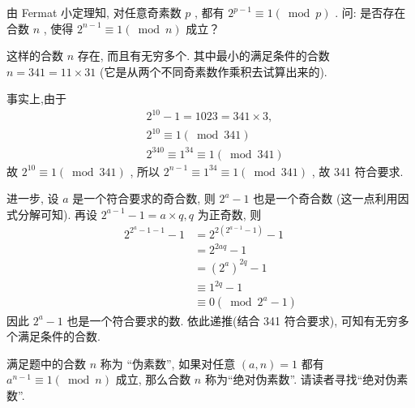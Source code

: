 \begin{example}
	由 Fermat 小定理知, 对任意奇素数 $p$ , 都有 $2^{p-1} \equiv 1(\bmod p)$ . 问: 是否存在合数 $n$ , 使得 $2^{n-1} \equiv 1(\bmod n)$ 成立？
\end{example}
\begin{solution}
	这样的合数 $n$ 存在, 而且有无穷多个. 其中最小的满足条件的合数 $n=341=11 \times 31$ (它是从两个不同奇素数作乘积去试算出来的).

	事实上,由于
	\begin{align*}
		 & 2^{10}-1=1023=341 \times 3,               \\
		 & 2^{10} \equiv 1(\bmod 341)                \\
		 & 2^{340} \equiv 1^{34} \equiv 1(\bmod 341)
	\end{align*}
	故 $2^{10} \equiv 1(\bmod 341)$ ,
	所以  $2^{n-1} \equiv 1^34 \equiv 1(\bmod 341)$ ,
	故 341 符合要求.

	进一步, 设 $a$ 是一个符合要求的奇合数, 则 $2^{a}-1$ 也是一个奇合数 (这一点利用因式分解可知). 再设 $2^{a-1}-1=a \times q, q$ 为正奇数, 则
	\begin{align*}
		2^{2^{a}-1-1}-1 & =2^{2\left(2^{a-1}-1\right)}-1     \\
		                & =2^{2 a q}-1                       \\
		                & =\left(2^{a}\right)^{2 q}-1        \\
		                & \equiv 1^{2 q}-1                   \\
		                & \equiv 0\left(\bmod 2^{a}-1\right)
	\end{align*}
	因此 $2^{a}-1$ 也是一个符合要求的数. 依此递推(结合 341 符合要求), 可知有无穷多个满足条件的合数.
\end{solution}
\begin{note}
	满足题中的合数 $n$ 称为 “伪素数”, 如果对任意 $(a, n)=1$ 都有 $a^{n-1} \equiv 1(\bmod n)$ 成立, 那么合数 $n$ 称为“绝对伪素数”. 请读者寻找“绝对伪素数”.
\end{note}

